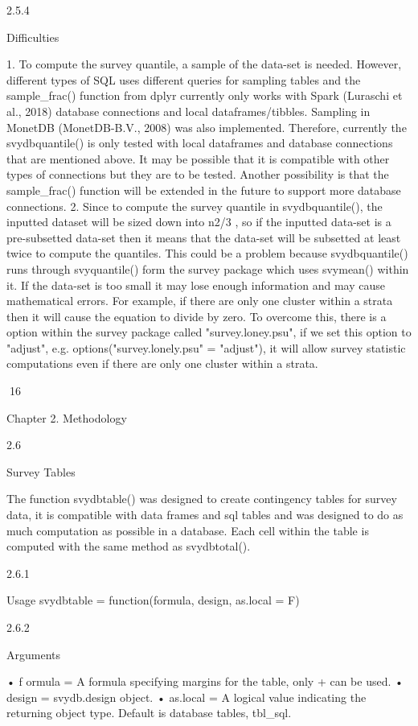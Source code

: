 2.5.4

Difficulties

1. To compute the survey quantile, a sample of the data-set is needed. However, different types of SQL uses different queries for sampling tables and the
sample_frac() function from dplyr currently only works with Spark (Luraschi
et al., 2018) database connections and local dataframes/tibbles. Sampling in
MonetDB (MonetDB-B.V., 2008) was also implemented. Therefore, currently
the svydbquantile() is only tested with local dataframes and database connections that are mentioned above. It may be possible that it is compatible
with other types of connections but they are to be tested. Another possibility
is that the sample_frac() function will be extended in the future to support
more database connections.
2. Since to compute the survey quantile in svydbquantile(), the inputted dataset will be sized down into n2/3 , so if the inputted data-set is a pre-subsetted
data-set then it means that the data-set will be subsetted at least twice to compute the quantiles. This could be a problem because svydbquantile() runs
through svyquantile() form the survey package which uses svymean() within
it. If the data-set is too small it may lose enough information and may cause
mathematical errors. For example, if there are only one cluster within a strata
then it will cause the equation to divide by zero.
To overcome this, there is a option within the survey package called "survey.loney.psu", if we set this option to "adjust", e.g. options("survey.lonely.psu"
= "adjust"), it will allow survey statistic computations even if there are only
one cluster within a strata.

16

Chapter 2. Methodology

2.6

Survey Tables

The function svydbtable() was designed to create contingency tables for survey
data, it is compatible with data frames and sql tables and was designed to do as
much computation as possible in a database.
Each cell within the table is computed with the same method as svydbtotal().

2.6.1

Usage
svydbtable = function(formula, design, as.local = F)

2.6.2

Arguments

• f ormula = A formula specifying margins for the table, only + can be used.
• design = svydb.design object.
• as.local = A logical value indicating the returning object type. Default is database
tables, tbl_sql.

